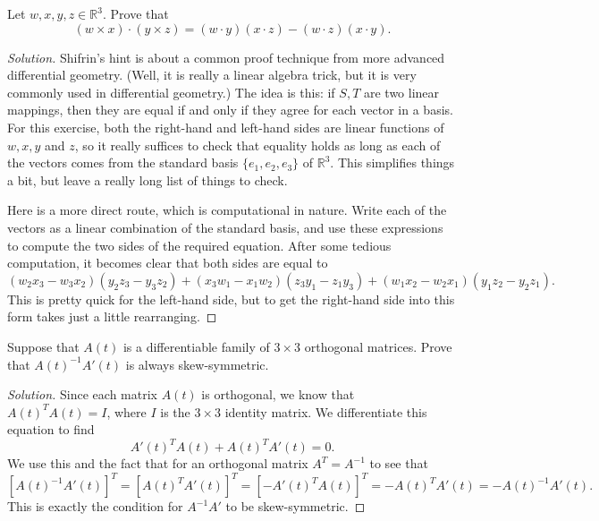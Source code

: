 \documentclass[Shifrin_Solutions_Spring_2018.tex]{subfiles}
\begin{document}
\vspace{1cm}



\begin{exercise} Let $w, x, y, z \in \mathbb{R}^3$. Prove that
\[
(w \times x) \cdot (y \times z) = (w\cdot y)(x \cdot z) - (w\cdot z)(x\cdot y).
\]
\end{exercise}

\begin{proof}[Solution] Shifrin's hint is about a common proof technique from more advanced differential geometry. (Well, it is really a linear algebra trick, but it is very commonly used in differential geometry.) The idea is this: if $S, T$ are two linear mappings, then they are equal if and only if they agree for each vector in a basis. For this exercise, both the right-hand and left-hand sides are linear functions of $w, x, y$ and $z$, so it really suffices to check that equality holds as long as each of the vectors comes from the standard basis $\{e_1, e_2, e_3 \}$ of $\mathbb{R}^3$. This simplifies things a bit, but leave a really long list of things to check.

Here is a more direct route, which is computational in nature. Write each of the vectors as a linear combination of the standard basis, and use these expressions to compute the two sides of the required equation. After some tedious computation, it becomes clear that both sides are equal to
\[
(w_2 x_3 - w_3 x_2) ( y_2 z_3 - y_3z_2 ) + (x_3 w_1 - x_1 w_2) (z_3 y_1 - z_1 y_3) + (w_1x_2 - w_2 x_1) (y_1z_2 - y_2 z_1) .
\]
This is pretty quick for the left-hand side, but to get the right-hand side into this form takes just a little rearranging.
\end{proof}


\vspace{1cm}


\begin{exercise} Suppose that $A(t)$ is a differentiable family of $3\times 3$ orthogonal matrices. Prove that ${A(t)}^{-1}A'(t)$ is always skew-symmetric.
\end{exercise}

\begin{proof}[Solution]
Since each matrix $A(t)$ is orthogonal, we know that $ {A(t)}^T A(t)= I$, where $I$ is the $3\times 3$ identity matrix. We differentiate this equation to find
\[
 {A'(t)}^T A(t)  + {A(t)}^T A'(t) = 0 .
\]
We use this and the fact that for an orthogonal matrix $A^T = A^{-1}$ to see that
\[
[{A(t)}^{-1} A'(t) ]^T = [ {A(t)}^T A'(t)]^T = [- {A'(t)}^T A(t) ]^T = - {A(t)}^T A'(t) = - {A(t)}^{-1} A'(t) .
\]
This is exactly the condition for $A^{-1}A'$ to be skew-symmetric.
\end{proof}
\end{document}
